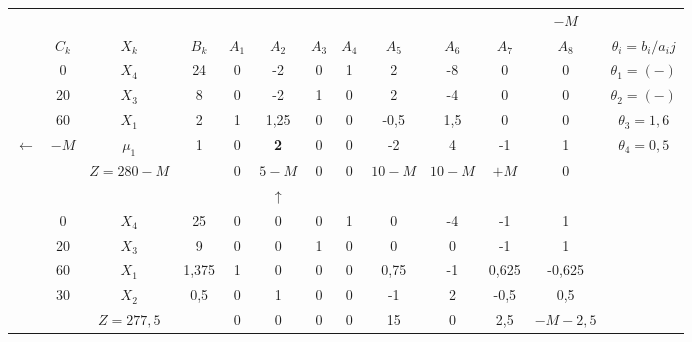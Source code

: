     \begin{tabular}{ccccccccccccc}
\cline{2-13}            &         &         &         &         &         &         &         &         &         &         & $-M$    &  \bigstrut[t]\\
            & $C_k$   & $X_k$   & $B_k$   & $A_1$   & $A_2$   & $A_3$   & $A_4$   & $A_5$   & $A_6$   & $A_7$   & $A_8$   & $\theta_i = b_i/a_ij$ \bigstrut[b]\\
\cline{2-13}            & 0       & $X_4$   & 24      & 0       & -2      & 0       & 1       & 2       & -8      & 0       & 0       & $\theta_1 = (-)$ \bigstrut[t]\\
            & 20      & $X_3$   & 8       & 0       & -2      & 1       & 0       & 2       & -4      & 0       & 0       & $\theta_2 = (-)$ \\
            & 60      & $X_1$   & 2       & 1       & 1,25    & 0       & 0       & -0,5    & 1,5     & 0       & 0       & $\theta_3 = 1,6$ \\
    $\leftarrow$ & $-M$    & \textcolor[rgb]{ 1,  0,  0}{\boldmath{}\textbf{$\mu_1$}\unboldmath{}} & 1       & 0       & \textbf{2} & 0       & 0       & -2      & 4       & -1      & 1       & \boldmath{}\textbf{$\theta_4 = 0,5$}\unboldmath{} \bigstrut[b]\\
\cline{2-13}            &         & $Z=280-M$ &         & 0       & \textcolor[rgb]{ 0,  .439,  .753}{\boldmath{}\textbf{$5-M$}\unboldmath{}} & 0       & 0       & $10-M$  & $10-M$  & $+M$    & 0       &  \bigstrut\\
\cline{2-13}            &         &         &         &         & $\uparrow$ &         &         &         &         &         &         &  \bigstrut\\
\cline{2-13}            & 0       & $X_4$   & 25      & 0       & 0       & 0       & 1       & 0       & -4      & -1      & 1       &  \bigstrut[t]\\
            & 20      & $X_3$   & 9       & 0       & 0       & 1       & 0       & 0       & 0       & -1      & 1       &  \\
            & 60      & $X_1$   & 1,375   & 1       & 0       & 0       & 0       & 0,75    & -1      & 0,625   & -0,625  &  \\
            & 30      & $X_2$   & 0,5     & 0       & 1       & 0       & 0       & -1      & 2       & -0,5    & 0,5     &  \bigstrut[b]\\
\cline{2-12}            &         & $Z=277,5$ &         & 0       & 0       & 0       & 0       & 15      & 0       & 2,5     & $-M-2,5$ &  \bigstrut\\
\cline{2-12}    \end{tabular}%
